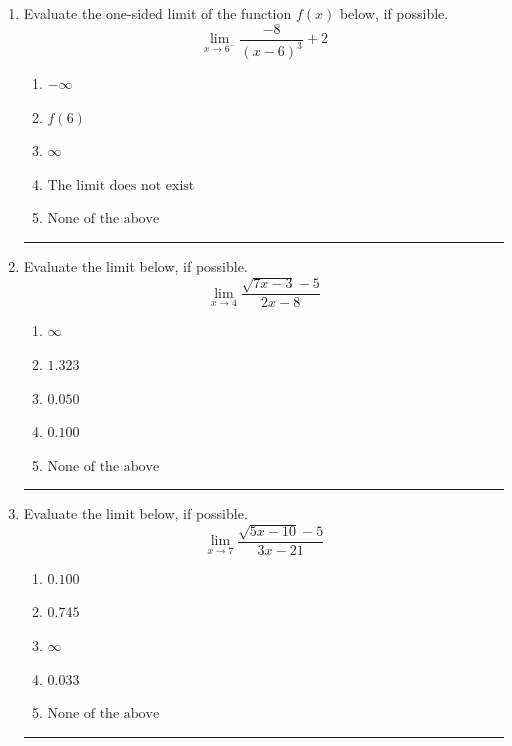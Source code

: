 \documentclass[14pt]{extbook}
\newcommand{\litem}[1]{\item#1\hspace*{-1cm}\rule{\textwidth}{0.4pt}}
\begin{document}
\begin{enumerate}
{\begin{enumerate}[label=\Alph*.]
\end{enumerate} }
\litem{
Evaluate the one-sided limit of the function $f(x)$ below, if possible.\[ \lim_{x \rightarrow 6^-} \frac{-8}{(x-6)^3}+2 \]\begin{enumerate}[label=\Alph*.]
\item \( -\infty \)
\item \( f(6) \)
\item \( \infty \)
\item \( \text{The limit does not exist} \)
\item \( \text{None of the above} \)

\end{enumerate} }
\litem{
Evaluate the limit below, if possible.\[ \lim_{x \rightarrow 4} \frac{\sqrt{7x - 3} - 5}{2x - 8} \]\begin{enumerate}[label=\Alph*.]
\item \( \infty \)
\item \( 1.323 \)
\item \( 0.050 \)
\item \( 0.100 \)
\item \( \text{None of the above} \)

\end{enumerate} }
\litem{
Evaluate the limit below, if possible.\[ \lim_{x \rightarrow 7} \frac{\sqrt{5x - 10} - 5}{3x - 21} \]\begin{enumerate}[label=\Alph*.]
\item \( 0.100 \)
\item \( 0.745 \)
\item \( \infty \)
\item \( 0.033 \)
\item \( \text{None of the above} \)


\end{enumerate}}
\end{enumerate}
\end{document}
